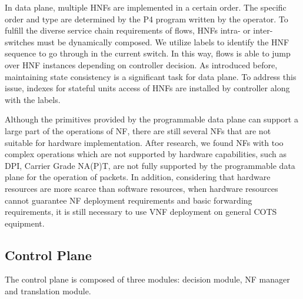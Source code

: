 \documentclass[10pt, conference, letterpaper]{IEEEtran}
\begin{document}
In data plane, multiple HNFs are implemented in a certain order. The specific order and type are determined by the P4 program written by the operator.
To fulfill the diverse service chain requirements of flows, HNFs intra- or inter-switches must be dynamically composed. We utilize labels to identify the HNF sequence to go through in the current switch. In this way, flows is able to jump over HNF instances depending on controller decision.
As introduced before, maintaining state consistency is a significant task for data plane. To address this issue, indexes for stateful units access of HNFs are installed by controller along with the labels.

Although the primitives provided by the programmable data plane can support a large part of the operations of NF, there are still several NFs that are not suitable for hardware implementation. After research, we found NFs with too complex operations which are not supported by hardware capabilities, such as DPI, Carrier Grade NA(P)T, are not fully supported by the programmable data plane for the operation of packets. 
In addition, considering that hardware resources are more scarce than software resources, when hardware resources cannot guarantee NF deployment requirements and basic forwarding requirements, it is still necessary to use VNF deployment on general COTS equipment.

%


\subsection{Control Plane}\label{BB}
The control plane is composed of three modules: decision module, NF manager and translation module.
\end{document}
